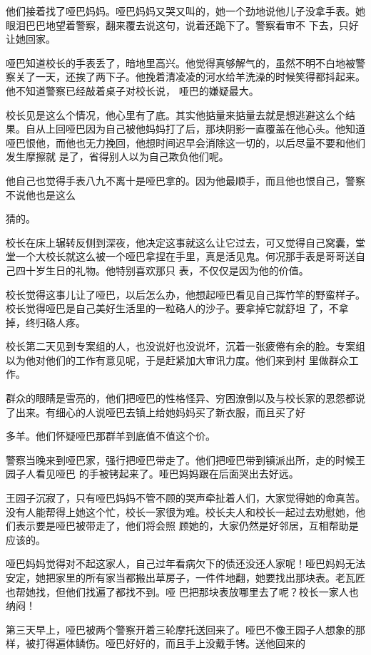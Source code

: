 \documentclass{article}
\begin{document}
\newpage

他们接着找了哑巴妈妈。哑巴妈妈又哭又叫的，她一个劲地说他儿子没拿手表。她眼泪巴巴地望着警察，翻来覆去说这句，说着还跪下了。警察看审不
下去，只好让她回家。 

哑巴知道校长的手表丢了，暗地里高兴。他觉得真够解气的，虽然不明不白地被警察关了一天，还挨了两下子。他挽着清凌凌的河水给羊洗澡的时候笑得都抖起来。他不知道警察已经敲着桌子对校长说，
哑巴的嫌疑最大。 

校长见是这么个情况，他心里有了底。其实他掂量来掂量去就是想逃避这么个结果。自从上回哑巴因为自己被他妈妈打了后，那块阴影一直覆盖在他心头。他知道哑巴恨他，而他也无力挽回，他想时间迟早会消除这一切的，以后尽量不要和他们发生摩擦就
是了，省得别人以为自己欺负他们呢。 

他自己也觉得手表八九不离十是哑巴拿的。因为他最顺手，而且他也恨自己，警察不说他也是这么

\newpage
猜的。 

校长在床上辗转反侧到深夜，他决定这事就这么让它过去，可又觉得自己窝囊，堂堂一个大校长就这么被一个哑巴拿捏在手里，真是活见鬼。何况那手表是哥哥送自己四十岁生日的礼物。他特别喜欢那只
表，不仅仅是因为他的价值。 

校长觉得这事儿让了哑巴，以后怎么办，他想起哑巴看见自己挥竹竿的野蛮样子。校长觉得哑巴是自己美好生活里的一粒硌人的沙子。要拿掉它就舒坦
了，不拿掉，终归硌人疼。 

校长第二天见到专案组的人，也没说好也没说坏，沉着一张疲倦有余的脸。专案组以为他对他们的工作有意见呢，于是赶紧加大审讯力度。他们来到村
里做群众工作。 

群众的眼睛是雪亮的，他们把哑巴的性格怪异、穷困潦倒以及与校长家的恩怨都说了出来。有细心的人说哑巴去镇上给她妈妈买了新衣服，而且买了好

\newpage
多羊。他们怀疑哑巴那群羊到底值不值这个价。 

警察当晚来到哑巴家，强行把哑巴带走了。他们把哑巴带到镇派出所，走的时候王园子人看见哑巴
的手被铐起来了。哑巴妈妈跟在后面哭出去好远。 

王园子沉寂了，只有哑巴妈妈不管不顾的哭声牵扯着人们，大家觉得她的命真苦。没有人能帮得上她这个忙，校长一家很为难。校长夫人和校长一起过去劝慰她，他们表示要是哑巴被带走了，他们将会照
顾她的，大家仍然是好邻居，互相帮助是应该的。 

哑巴妈妈觉得对不起这家人，自己过年看病欠下的债还没还人家呢！哑巴妈妈无法安定，她把家里的所有家当都搬出草房子，一件件地翻，她要找出那块表。老瓦匠也帮她找，但他们找遍了都找不到。哑
巴把那块表放哪里去了呢？校长一家人也纳闷！ 

第三天早上，哑巴被两个警察开着三轮摩托送回来了。哑巴不像王园子人想象的那样，被打得遍体鳞伤。哑巴好好的，而且手上没戴手铐。送他回来的
\end{document}
